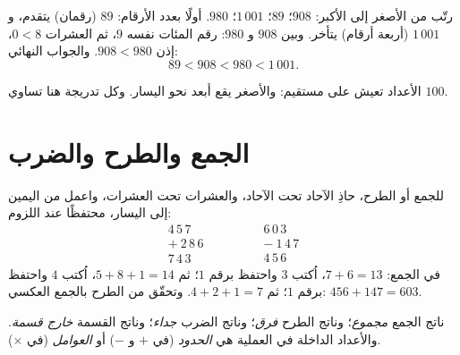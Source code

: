 \begin{example}\label{ex:g6:wholes:order}
رتّب من الأصغر إلى الأكبر: $908$؛ $89$؛ $1\,001$؛ $980$.
أولًا بعدد الأرقام: $89$ (رقمان) يتقدم، و $1\,001$ (أربعة
أرقام) يتأخر. وبين $908$ و $980$: رقم المئات نفسه $9$، ثم
العشرات $0 < 8$، إذن $908 < 980$. والجواب النهائي:
\[
89 < 908 < 980 < 1\,001 .
\]
\end{example}

\begin{omfigure}

{\small الأعداد تعيش على مستقيم: والأصغر يقع أبعد نحو اليسار. وكل
تدريجة هنا تساوي $100$.}
\end{omfigure}

\section{الجمع والطرح والضرب}

\begin{example}\label{ex:g6:wholes:columns}
للجمع أو الطرح، حاذِ الآحاد تحت الآحاد، والعشرات تحت
العشرات، واعمل من اليمين إلى اليسار، محتفظًا عند اللزوم:
\[
\begin{array}{r}
4\,5\,7 \\
+\ 2\,8\,6 \\
\hline
7\,4\,3
\end{array}
\qquad\qquad
\begin{array}{r}
6\,0\,3 \\
-\ 1\,4\,7 \\
\hline
4\,5\,6
\end{array}
\]
في الجمع: $7 + 6 = 13$، اُكتب $3$ واحتفظ برقم $1$؛ ثم
$5 + 8 + 1 = 14$، اُكتب $4$ واحتفظ برقم $1$؛ ثم $4 + 2 + 1 = 7$.
وتحقّق من الطرح بالجمع العكسي: $456 + 147 = 603$.
\end{example}

\begin{remark}[المفردات]
ناتج الجمع \emph{مجموع}؛ وناتج الطرح
\emph{فرق}؛ وناتج الضرب
\emph{جداء}؛ وناتج القسمة
\emph{خارج قسمة}. والأعداد الداخلة في العملية هي
\emph{الحدود} (في $+$ و $-$) أو \emph{العوامل} (في $\times$).
\end{remark}

